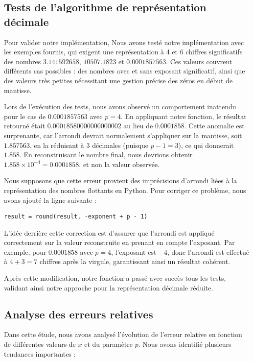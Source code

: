 \documentclass{article}
\begin{document}
\subsection{Tests de l’algorithme de représentation décimale}

Pour valider notre implémentation, Nous avons testé notre implémentation avec les exemples fournis, qui exigent une représentation à 4 et 6 chiffres significatifs des nombres $3.141592658$, $10507.1823$ et $0.0001857563$. Ces valeurs couvrent différents cas possibles : des nombres avec et sans exposant significatif, ainsi que des valeurs très petites nécessitant une gestion précise des zéros en début de mantisse.

Lors de l’exécution des tests, nous avons observé un comportement inattendu pour le cas de $0.0001857563$ avec $p=4$. En appliquant notre fonction, le résultat retourné était $0.00018580000000000002$ au lieu de $0.0001858$. Cette anomalie est surprenante, car l’arrondi devrait normalement s’appliquer sur la mantisse, soit $1.857563$, en la réduisant à 3 décimales (puisque $p-1=3$), ce qui donnerait $1.858$. En reconstruisant le nombre final, nous devrions obtenir $1.858 \times 10^{-4} = 0.0001858$, et non la valeur observée.

Nous supposons que cette erreur provient des imprécisions d’arrondi liées à la représentation des nombres flottants en Python. Pour corriger ce problème, nous avons ajouté la ligne suivante :

\begin{verbatim}
result = round(result, -exponent + p - 1)
\end{verbatim}

L'idée derrière cette correction est d'assurer que l'arrondi est appliqué correctement sur la valeur reconstruite en prenant en compte l'exposant. Par exemple, pour $0.0001858$ avec $p=4$, l'exposant est $-4$, donc l’arrondi est effectué à $4 + 3 = 7$ chiffres après la virgule, garantissant ainsi un résultat cohérent.

Après cette modification, notre fonction a passé avec succès tous les tests, validant ainsi notre approche pour la représentation décimale réduite.


\subsection{Analyse des erreurs relatives}
Dans cette étude, nous avons analysé l'évolution de l'erreur relative en fonction de différentes valeurs de $x$ et du paramètre $p$. Nous avons identifié plusieurs tendances importantes :
\end{document}
